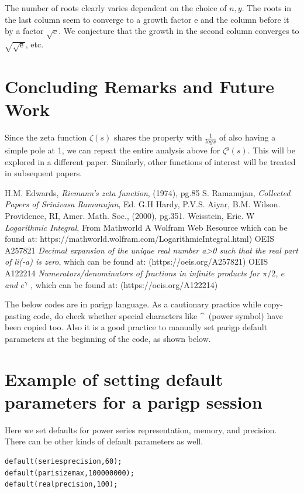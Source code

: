 \documentclass[a4paper,11pt,twoside]{amsart}
\newcommand\e{\mathrm{e}}
\begin{document}
The number of roots clearly varies dependent on the choice of $n, y$. The roots in the last column seem to converge to a growth factor $\e$ and the column before it by a factor $\sqrt{\e}$. We conjecture that the growth in the second column converges to $\sqrt{\sqrt{\e}}$, etc.


  
\section{Concluding Remarks and Future Work}

Since the zeta function $\zeta(s)$ shares the property with $\frac{1}{log x}$ of also having a simple pole at 1, we can repeat the entire analysis above for $\zeta^{y}(s)$. This will be explored in a different paper. Similarly, other functions of interest will be treated in subsequent papers. 

\begin{thebibliography}{99} 

H.M. Edwards, \emph{Riemann's zeta function}, (1974), pg.85
S. Ramanujan, \emph{Collected Papers of Srinivasa Ramanujan}, Ed. G.H Hardy, P.V.S. Aiyar, B.M. Wilson. Providence, RI, Amer. Math. Soc., (2000), pg.351.
Weisstein, Eric. W \emph{Logarithmic Integral}, From Mathworld A Wolfram Web Resource which can be found at: https://mathworld.wolfram.com/LogarithmicIntegral.html)
OEIS A257821 \emph{Decimal expansion of the unique real number a>0 such that the real part of li(-a) is zero}, which can be found at: (https://oeis.org/A257821)
OEIS A122214 \emph{Numerators/denominators of fractions in infinite products for $\pi/2$, $e$ and $e^\gamma$ }, which can be found at: (https://oeis.org/A122214)
\end{thebibliography} 

\pagebreak

\appendix
\appendixpage
The below codes are in parigp language. As a cautionary practice while copy-pasting code, do check whether special characters like \textasciicircum \, (power symbol) have been copied too. Also it is a good practice to manually set parigp default parameters at the beginning of the code, as shown below.

\section{Example of setting default parameters for a parigp session}
Here we set defaults for power series representation, memory, and precision. There can be other kinds of default parameters as well.
\begin{verbatim}
default(seriesprecision,60);
default(parisizemax,100000000);
default(realprecision,100);
\end{verbatim}
\end{document}
